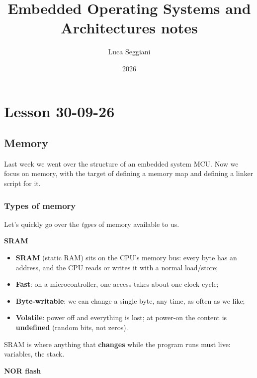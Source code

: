 \documentclass[a4paper,11pt]{article}
\title{Embedded Operating Systems and Architectures notes}
\author{Luca Seggiani}
\date{2026}
\begin{document}
\section{Lesson 30-09-26}

\thispagestyle{empty}
\pagestyle{fancy}


\subsection{Memory}

Last week we went over the structure of an embedded system MCU.
Now we focus on memory, with the target of defining a memory map and defining a linker script for it.

\subsubsection{Types of memory}

Let's quickly go over the \textit{types} of memory available to us.

\par\smallskip
\textbf{\textsf{SRAM}}

\begin{itemize}

	\item
	      \textbf{SRAM} (static RAM) sits on the CPU's memory bus: every byte
	      has an address, and the CPU reads or writes it with a normal
	      load/store;
	\item
	      \textbf{Fast}: on a microcontroller, one access takes about one clock
	      cycle;
	\item
	      \textbf{Byte-writable}: we can change a single byte, any time, as
	      often as we like;
	\item
	      \textbf{Volatile}: power off and everything is lost; at power-on the
	      content is \textbf{undefined} (random bits, not zeros).
\end{itemize}

SRAM is where anything that \textbf{changes} while the program runs must
live: variables, the stack.

\par\smallskip
\textbf{\textsf{NOR flash}}
\end{document}
